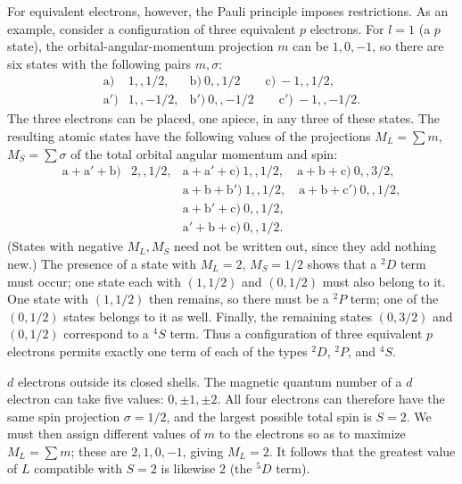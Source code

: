 For equivalent electrons, however, the Pauli principle imposes restrictions.
As an example, consider a configuration of three equivalent $p$ electrons.
For $l=1$ (a $p$ state), the orbital-angular-momentum projection $m$ can be
$1,0,-1$, so there are six states with the following pairs $m,\sigma$:
\[
\begin{array}{lll}
\mathrm a)&1,,1/2,&\mathrm b)\ 0,,1/2\qquad \mathrm c)\ -1,,1/2,\\
\mathrm a')&1,,-1/2,&\mathrm b')\ 0,,-1/2\qquad \mathrm c')\ -1,,-1/2.
\end{array}
\]
The three electrons can be placed, one apiece, in any three of these states.
The resulting atomic states have the following values of the projections
$M_L=\sum m$, $M_S=\sum\sigma$ of the total orbital angular momentum and
spin:
\[
\begin{array}{lll}
\mathrm a+\mathrm a'+\mathrm b)&2,,1/2,&
\mathrm a+\mathrm a'+\mathrm c)\ 1,,1/2,
\quad \mathrm a+\mathrm b+\mathrm c)\ 0,,3/2,\\
&&\mathrm a+\mathrm b+\mathrm b')\ 1,,1/2,
\quad \mathrm a+\mathrm b+\mathrm c')\ 0,,1/2,\\
&&\mathrm a+\mathrm b'+\mathrm c)\ 0,,1/2,\\
&&\mathrm a'+\mathrm b+\mathrm c)\ 0,,1/2.
\end{array}
\]
(States with negative $M_L,M_S$ need not be written out, since they add
nothing new.) The presence of a state with $M_L=2$, $M_S=1/2$ shows that a
${}^2D$ term must occur; one state each with $(1,1/2)$ and $(0,1/2)$ must also
belong to it. One state with $(1,1/2)$ then remains, so there must be a
${}^2P$ term; one of the $(0,1/2)$ states belongs to it as well. Finally, the
remaining states $(0,3/2)$ and $(0,1/2)$ correspond to a ${}^4S$ term. Thus a
configuration of three equivalent $p$ electrons permits exactly one term of
each of the types ${}^2D$, ${}^2P$, and ${}^4S$.

 $d$ electrons outside its closed
shells. The magnetic quantum number of a $d$ electron can take five values:
$0,\pm1,\pm2$. All four electrons can therefore have the same spin projection
$\sigma=1/2$, and the largest possible total spin is $S=2$. We must then
assign different values of $m$ to the electrons so as to maximize
$M_L=\sum m$; these are $2,1,0,-1$, giving $M_L=2$. It follows that the
greatest value of $L$ compatible with $S=2$ is likewise 2 (the ${}^5D$ term).

